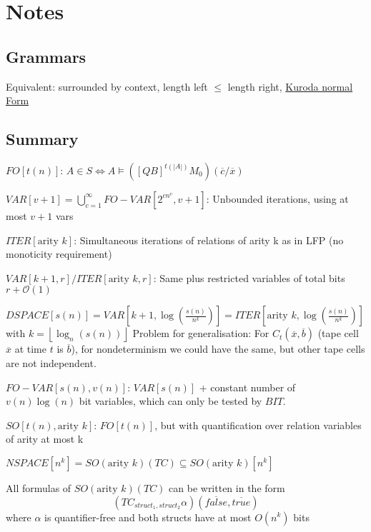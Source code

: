 \chapter{Notes}\label{sec:notes}

\section{Grammars}\label{grammars}

Equivalent: surrounded by context, length left \(\leq\) length right,
\href{https://en.wikipedia.org/wiki/Kuroda_normal_form}{Kuroda normal
Form}

\section{Summary}\label{summary}

\(FO[t(n)]\):
\(A \in S \Leftrightarrow A \models \left([QB]^{t(|A|)}M_{0}\right)(\overline{c}/\overline{x})\)

\noindent\(VAR[v + 1] = \bigcup_{c = 1}^{\infty}FO-VAR[2^{cn^{v}}, v + 1]\):
Unbounded iterations, using at most \(v + 1\) vars

\noindent\(ITER[\text{arity } k]\): Simultaneous iterations of relations of arity
k as in LFP (no monoticity requirement)

\noindent\(VAR[k + 1, r] / ITER[\text{arity } k, r]\): Same plus restricted
variables of total bits \(r + \mathcal{O}(1)\)

\noindent\(DSPACE[s(n)] = VAR\left[ k + 1, \log\left( \frac{s(n)}{n^{k}} \right) \right] = ITER[\text{arity } k, \log\left( \frac{s(n)}{n^{k}} \right)]\)
with \(k = \left\lfloor \log_{n}(s(n)) \right\rfloor\) Problem for
generalisation: For \(C_{t}(\overline{x}, \overline{b})\) (tape cell
\(\overline{x}\) at time \(t\) is \(\overline{b}\)), for nondeterminism
we could have the same, but other tape cells are not independent.

\noindent\(FO-VAR[s(n), v(n)]\): \(VAR[s(n)]\) + constant number of
\(v(n)\log(n)\) bit variables, which can only be tested by \(BIT\).

\noindent\(SO[t(n), \text{arity }k]\): \(FO[t(n)]\), but with quantification over
relation variables of arity at most k

\noindent\(NSPACE[n^{k}] = SO(\text{arity }k)(TC) \subseteq SO(\text{arity } k)[n^{k}]\)

All formulas of \(SO(\text{arity }k)(TC)\) can be written in the form \[
(TC_{struct_{1}, struct_{2}}\alpha)(\overline{false}, \overline{true})
\] where \(\alpha\) is quantifier-free and both structs have at most
\(O(n^{k})\) bits


